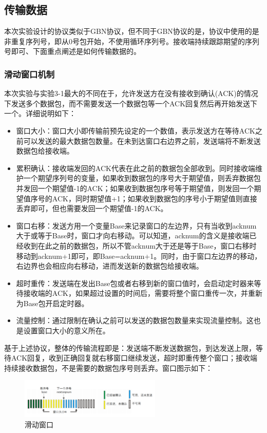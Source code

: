 \documentclass[UTF8,a4paper,10pt]{ctexart}
\begin{document}
\subsection{传输数据}
本次实验设计的协议类似于GBN协议，但不同于GBN协议的是，协议中使用的是非重复序列号，即从0号包开始，不使用循环序列号。接收端持续跟踪期望的序列号即可、下面重点阐述是如何传输数据的。
\subsubsection{滑动窗口机制}
本次实验与实验3-1最大的不同在于，允许发送方在没有接收到确认(ACK)的情况下发送多个数据包，而不需要发送一个数据包等一个ACK回复然后再开始发送下一个。详细说明如下：
\begin{itemize}
\item 窗口大小：窗口大小即传输前预先设定的一个数值，表示发送方在等待ACK之前可以发送的最大数据包数量。在未到达窗口右边界之前，发送端将不断发送数据包给接收端。
\item 累积确认：接收端发回的ACK代表在此之前的数据包全部收到。同时接收端维护一个期望序列号的变量，如果收到数据包的序号大于期望值，则丢弃数据包并发回一个期望值-1的ACK；如果收到数据包序号等于期望值，则发回一个期望值序号的ACK，同时期望值+1；如果收到数据包的序号小于期望值则直接丢弃即可，但也需要发回一个期望值-1的ACK。
\item 窗口右移：发送方用一个变量Base来记录窗口的左边界，只有当收到acknum大于或等于Base时，窗口才向右移动。可以知道，acknum的含义是接收端已经收到在此之前的数据包，所以不管acknum大于还是等于Base，窗口右移时移动到acknum+1即可，即Base=acknum+1。同时，由于窗口左边界的移动，右边界也会相应向右移动，进而发送新的数据包给接收端。
\item 超时重传：发送端在发出Base包或者右移到新的窗口值时，会启动定时器来等待接收端的ACK，如果超过设置的时间后，需要将整个窗口重传一次，并重新为Base包开启定时器。
\item 流量控制：通过限制在确认之前可以发送的数据包数量来实现流量控制。这也是设置窗口大小的意义所在。
\end{itemize}\par
基于上述协议，整体的传输流程即是：发送端不断发送数据包，到达发送上限，等待ACK回复，收到正确回复就右移窗口继续发送，超时即重传整个窗口；接收端持续接收数据包，不是需要的数据包序号则丢弃。窗口图示如下：
\begin{figure}[H]
    \centering
\includegraphics[width=0.6\textwidth]{img/滑动窗口.png}
    \caption{滑动窗口}
\end{figure}
\end{document}
